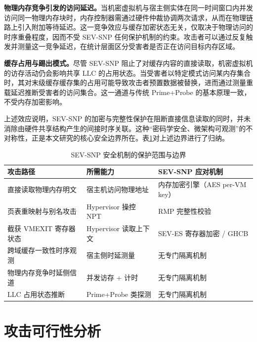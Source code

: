 \textbf{物理内存竞争引发的访问延迟。}当机密虚拟机与宿主侧实体在同一时间窗口内并发访问同一物理内存块时，内存控制器需通过硬件仲裁协调两次请求，从而在物理链路上引入附加等待延迟。这一竞争效应与缓存加密状态无关，仅取决于物理访问的时序重叠程度，因而不受 SEV-SNP 任何保护机制的约束\cite{chiang2025reloadreload,ge2018survey}。攻击者可以通过反复触发并测量这一竞争延迟，在统计层面区分受害者是否正在访问目标内存区域。

\textbf{缓存占用与踢出模式。}尽管 SEV-SNP 阻止了对缓存内容的直接读取，机密虚拟机的访存活动仍会影响共享 LLC 的占用状态。当受害者以特定模式访问某内存集合时，其对末级缓存缓存集的占用可能导致攻击者预置数据被替换，进而通过测量重载延迟推断受害者的访问集合\cite{osvik2006cache}。这一通道与传统 Prime+Probe 的基本原理一致，不受内存加密影响。

上述效应说明，SEV-SNP 的加密与完整性保护在阻断直接信息读取的同时，并未消除由硬件共享结构产生的间接时序关联。这种“密码学安全、微架构可观测”的不对称性，正是本文研究的核心安全边界所在。表\ref{tab:sev_snp_boundary}对上述边界进行了归纳。

\begin{table}[htbp]
  \centering
  \renewcommand{\arraystretch}{1.2}
  \caption{SEV-SNP 安全机制的保护范围与边界}
  \label{tab:sev_snp_boundary}
  \begin{tabular}{p{3.2cm}p{3.6cm}p{3.6cm}}
    \hline
    攻击路径 & 所需能力 & SEV-SNP 应对机制\\
    \hline
    直接读取物理内存明文
    & 宿主机访问物理地址
    & 内存加密引擎（AES per-VM key）\\

    页表重映射与别名攻击
    & Hypervisor 操控 NPT
    & RMP 完整性校验 \\

    截获 VMEXIT 寄存器状态
    & Hypervisor 读取上下文
    & SEV-ES 寄存器加密 / GHCB \\

    跨域缓存一致性时序观测
    & 宿主侧时延测量
    & 无专门隔离机制 \\

    物理内存竞争时延侧信道
    & 并发访存 + 计时
    & 无专门隔离机制 \\

    LLC 占用状态推断
    & Prime+Probe 类探测
    & 无专门隔离机制 \\
    \hline
  \end{tabular}
\end{table}

\section{攻击可行性分析}

